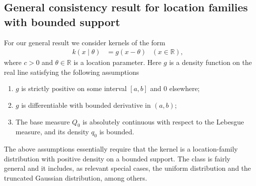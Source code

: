 \documentclass[12pt]{article}
\begin{document}
\subsection{General consistency result for location families\\with bounded support}\label{sec:Bound}
For our general result we consider kernels of the form 
\begin{equation}\label{data_generating_general}
\begin{aligned}
k(x \mid \theta) &= g(x - \theta)%
 &(x\in\mathbb{R}),
\end{aligned}
\end{equation}
where $c > 0$ and $\theta\in\mathbb{R}$ is a location parameter. Here $g$ is a density function on the real line satisfying the following assumptions
\begin{enumerate}
	\item[$B1.$] $g$ is strictly positive on some interval $[a,b]$
	 and 0 elsewhere;
	\item[$B2.$] $g$ is differentiable with bounded derivative in $(a,b)$; 
	\item[$B3.$] The base measure $Q_0$ is absolutely continuous with respect to the Lebesgue measure, and its density $q_0$ is bounded. %
\end{enumerate}
The above assumptions essentially require that the kernel is a location-family distribution with positive density on a bounded support. The class is fairly general and it includes, as relevant special cases, the uniform distribution and the truncated Gaussian distribution, among others.
\end{document}
